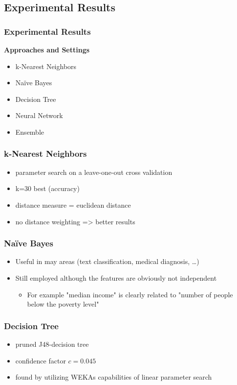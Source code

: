 \mode*
\begin{frame}
 	\section{Experimental Results}
 	\frametitle{Experimental Results}
 	\onslide<+->
	\textbf{Approaches and Settings}
	\begin{itemize}
		\item<+-> k-Nearest Neighbors
		\item<+-> Na\"ive Bayes
		\item<+-> Decision Tree
		\item<+-> Neural Network
		\item<+-> Ensemble
	\end{itemize}
\end{frame}

\begin{frame}
	\frametitle{k-Nearest Neighbors}
	\onslide<+->
	\begin{itemize}
		\item<+-> parameter search on a leave-one-out cross validation
		\item<+-> k=30 best (accuracy)
		\item<+-> distance measure = euclidean distance
		\item<+-> no distance weighting => better results
	\end{itemize}
\end{frame}

\begin{frame}
	\frametitle{Na\"ive Bayes}
        \begin{itemize}
          \item<+-> Useful in may areas (text classification, medical diagnosis, \ldots)
          \item<+-> Still employed although the features are obviously not independent
          \begin{itemize}
            \item<+-> For example "median income" is clearly related to "number of people below the poverty level"
          \end{itemize}
        \end{itemize}
\end{frame}

\begin{frame}[fragile]
	\frametitle{Decision Tree}
	\onslide<+->
	\begin{itemize}
		\item<+-> pruned J48-decision tree
		\item<+-> confidence factor \(c=0.045\)
		\item<+-> found by utilizing WEKAs capabilities of linear
		parameter search
	\end{itemize}
\end{frame}

